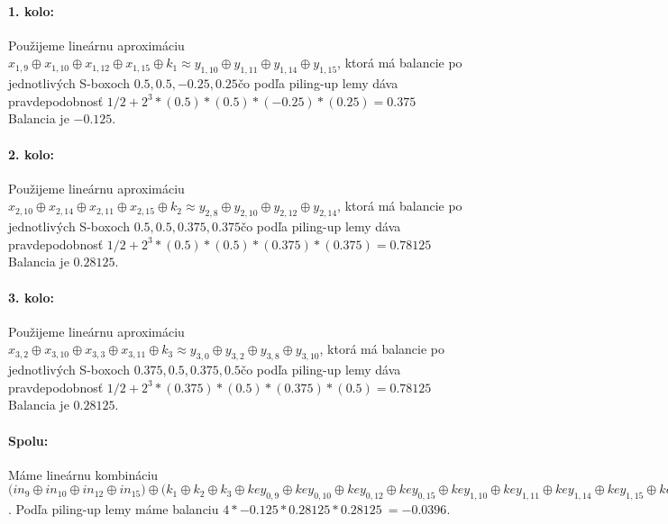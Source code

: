 \paragraph{1. kolo:}
Použijeme lineárnu aproximáciu $
x_{1,9} \oplus x_{1,10} \oplus x_{1,12} \oplus x_{1,15}  \oplus k_{1} 
 \approx 
y_{1,10} \oplus y_{1,11} \oplus y_{1,14} \oplus y_{1,15} $,
ktorá má balancie po jednotlivých S-boxoch $
0.5,0.5,-0.25,0.25
$čo podľa piling-up lemy dáva pravdepodobnosť 
$1/2 + 2^3*( 0.5)*(0.5)*(-0.25)*(0.25 )= 0.375 $
Balancia je $-0.125$.

\paragraph{2. kolo:}
Použijeme lineárnu aproximáciu $
x_{2,10} \oplus x_{2,14} \oplus x_{2,11} \oplus x_{2,15}  \oplus k_{2} 
 \approx 
y_{2,8} \oplus y_{2,10} \oplus y_{2,12} \oplus y_{2,14} $,
ktorá má balancie po jednotlivých S-boxoch $
0.5,0.5,0.375,0.375
$čo podľa piling-up lemy dáva pravdepodobnosť 
$1/2 + 2^3*( 0.5)*(0.5)*(0.375)*(0.375 )= 0.78125 $
Balancia je $0.28125$.

\paragraph{3. kolo:}
Použijeme lineárnu aproximáciu $
x_{3,2} \oplus x_{3,10} \oplus x_{3,3} \oplus x_{3,11}  \oplus k_{3} 
 \approx 
y_{3,0} \oplus y_{3,2} \oplus y_{3,8} \oplus y_{3,10} $,
ktorá má balancie po jednotlivých S-boxoch $
0.375,0.5,0.375,0.5
$čo podľa piling-up lemy dáva pravdepodobnosť 
$1/2 + 2^3*( 0.375)*(0.5)*(0.375)*(0.5 )= 0.78125 $
Balancia je $0.28125$.

\paragraph{Spolu:}  Máme lineárnu kombináciu $ \Big(
in_{9} \oplus in_{10} \oplus in_{12} \oplus in_{15}
\Big) \oplus \Big( k_1 \oplus k_2 \oplus k_3 \oplus 
key_{0,9} \oplus key_{0,10} \oplus key_{0,12} \oplus key_{0,15} \oplus key_{1,10} \oplus key_{1,11} \oplus key_{1,14} \oplus key_{1,15} \oplus key_{2,2} \oplus key_{2,3} \oplus key_{2,10} \oplus key_{2,11} \oplus key_{3,0} \oplus key_{3,2} \oplus key_{3,8} \oplus key_{3,10} \Big) \approx \Big(
out_{0} \oplus out_{2} \oplus out_{8} \oplus out_{10}
\Big) $.
Podľa piling-up lemy máme balanciu $4* -0.125*0.28125*0.28125 ~= -0.0396 $.
